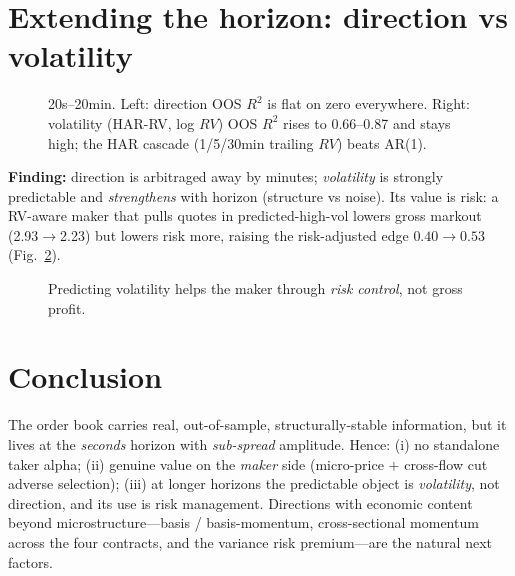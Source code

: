 \documentclass[11pt]{article}
\begin{document}
\section{Extending the horizon: direction vs volatility}
\begin{figure}[H]\centering
  \caption{20s--20min. Left: direction OOS $R^2$ is flat on zero everywhere. Right: volatility
  (HAR-RV, log $R\!V$) OOS $R^2$ rises to 0.66--0.87 and stays high; the HAR cascade
  (1/5/30min trailing $R\!V$) beats AR(1).}
  \label{fig:horizon}
\end{figure}
\textbf{Finding:} direction is arbitraged away by minutes; \emph{volatility} is strongly
predictable and \emph{strengthens} with horizon (structure vs noise). Its value is risk:
a RV-aware maker that pulls quotes in predicted-high-vol lowers gross markout (2.93$\to$2.23)
but lowers risk more, raising the risk-adjusted edge $0.40\to0.53$ (Fig.~\ref{fig:volmaker}).
\begin{figure}[H]\centering
  \caption{Predicting volatility helps the maker through \emph{risk control}, not gross profit.}
  \label{fig:volmaker}
\end{figure}

\section{Conclusion}
The order book carries real, out-of-sample, structurally-stable information, but it lives at the
\emph{seconds} horizon with \emph{sub-spread} amplitude. Hence: (i) no standalone taker alpha;
(ii) genuine value on the \emph{maker} side (micro-price $+$ cross-flow cut adverse selection);
(iii) at longer horizons the predictable object is \emph{volatility}, not direction, and its use
is risk management. Directions with economic content beyond microstructure---basis / basis-momentum,
cross-sectional momentum across the four contracts, and the variance risk premium---are the
natural next factors.
\end{document}
